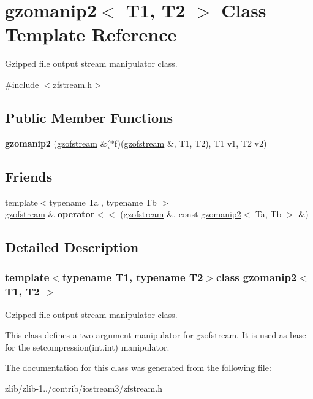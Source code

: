 \hypertarget{classgzomanip2}{\section{gzomanip2$<$ T1, T2 $>$ Class Template Reference}
\label{classgzomanip2}
}


Gzipped file output stream manipulator class.  




{\ttfamily \#include $<$zfstream.\+h$>$}

\subsection*{Public Member Functions}
\begin{DoxyCompactItemize}
\item 
\hypertarget{classgzomanip2_a6e3980ce2fa39e29ecfa537bb8e9ddb0}{{\bfseries gzomanip2} (\hyperlink{classgzofstream}{gzofstream} \&($\ast$f)(\hyperlink{classgzofstream}{gzofstream} \&, T1, T2), T1 v1, T2 v2)}\label{classgzomanip2_a6e3980ce2fa39e29ecfa537bb8e9ddb0}

\end{DoxyCompactItemize}
\subsection*{Friends}
\begin{DoxyCompactItemize}
\item 
\hypertarget{classgzomanip2_a2382d2b86b2af773d17c2bc349fddb4f}{{\footnotesize template$<$typename Ta , typename Tb $>$ }\\\hyperlink{classgzofstream}{gzofstream} \& {\bfseries operator$<$$<$} (\hyperlink{classgzofstream}{gzofstream} \&, const \hyperlink{classgzomanip2}{gzomanip2}$<$ Ta, Tb $>$ \&)}\label{classgzomanip2_a2382d2b86b2af773d17c2bc349fddb4f}

\end{DoxyCompactItemize}


\subsection{Detailed Description}
\subsubsection*{template$<$typename T1, typename T2$>$class gzomanip2$<$ T1, T2 $>$}

Gzipped file output stream manipulator class. 

This class defines a two-\/argument manipulator for gzofstream. It is used as base for the setcompression(int,int) manipulator. 

The documentation for this class was generated from the following file\+:\begin{DoxyCompactItemize}
\item 
zlib/zlib-\/1../contrib/iostream3/zfstream.\+h\end{DoxyCompactItemize}
